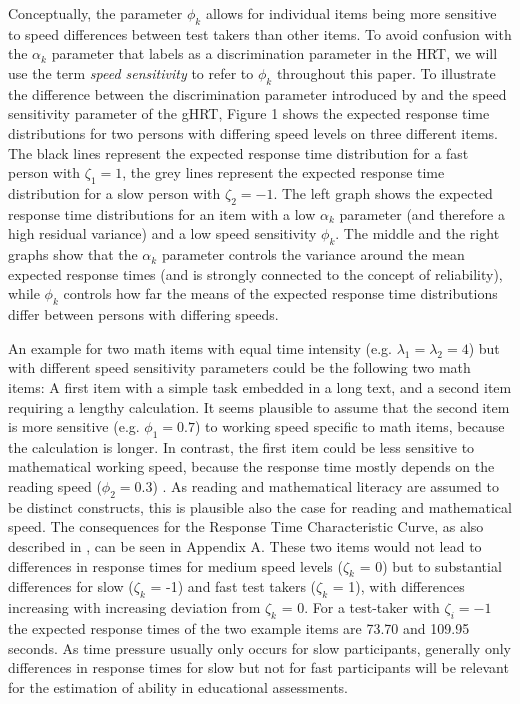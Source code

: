 \documentclass[a4paper,man,apacite,floatsintext,donotrepeattitle]{apa6}
\begin{document}
Conceptually, the parameter $\phi_{k}$ allows for individual items being more sensitive to speed differences between test takers than other items. To avoid confusion with the $\alpha_k$ parameter that   labels as a discrimination parameter in the HRT, we will use the term \textit{speed sensitivity} to refer to $\phi_{k}$ throughout this paper. To illustrate the difference between the discrimination parameter introduced by  and the speed sensitivity parameter of the gHRT, Figure 1 shows the  expected response time distributions for two persons with differing speed levels on three different items. The black lines represent the expected response time distribution for a fast person with $\zeta_1 = 1$, the grey lines represent the expected response time distribution for a slow person with $\zeta_2 = -1$. The left graph shows the expected response time distributions for an item with a low $\alpha_k$ parameter (and therefore a high residual variance) and a low speed sensitivity $\phi_k$. The middle and the right graphs show that the $\alpha_k$ parameter controls the variance around the mean expected response times (and is strongly connected to the concept of reliability), while $\phi_k$ controls how far the means of the expected response time distributions differ between persons with differing speeds.

An example for two math items with equal time intensity (e.g. $\lambda_1 = \lambda_2 = 4$) but with different speed sensitivity parameters could be the following two math items: A first item with a simple task embedded in a long text, and a second item requiring a lengthy calculation. It seems plausible to assume that the second item is more sensitive (e.g. $\phi_1 = 0.7$) to working speed specific to math items, because the calculation is longer. In contrast, the first item could be less sensitive to mathematical working speed, because the response time mostly depends on the reading speed ($\phi_2 = 0.3$) . As reading and mathematical literacy are assumed to be distinct constructs, this is plausible also the case for reading and mathematical speed. The consequences for the Response Time Characteristic Curve, as also described in , can be seen in Appendix A. These two items would not lead to differences in response times for medium speed levels ($\zeta_{k}$ = 0) but to substantial differences for slow ($\zeta_{k}$ = -1) and fast test takers ($\zeta_{k}$ = 1), with differences increasing with increasing deviation from $\zeta_{k}$ = 0. For a test-taker with $\zeta_i = -1$ the expected response times of the two example items are 73.70 and 109.95 seconds. As time pressure usually only occurs for slow participants, generally only differences in response times for slow but not for fast participants will be relevant for the estimation of ability in educational assessments.
\end{document}
